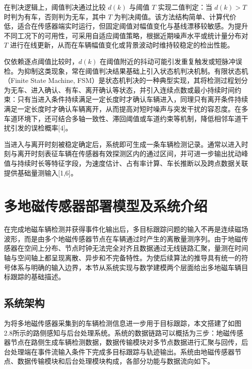 \documentclass{xdupgthesis}
\begin{document}
在判决逻辑上，阈值判决通过比较 $d(k)$ 与阈值 $T$ 实现二值判定：当 $d(k)>T$ 时判为有车，否则判为无车，其中 $T$ 为判决阈值。该方法结构简单、计算代价低，适合在传感器端实时运行，但固定阈值对幅值变化与基线漂移较敏感。为提升不同工况下的可用性，可采用自适应阈值策略，根据近期噪声水平或统计量分布对 $T$ 进行在线更新，从而在车辆幅值变化或背景波动时维持较稳定的检出性能。

仅依赖逐点阈值比较时，$d(k)$ 在阈值附近的抖动可能引发重复触发或短脉冲误检。为抑制这类现象，常在阈值判决结果基础上引入状态机判决机制。有限状态机（Finite State Machine, FSM）是状态机判决的一种典型实现，其将检测过程划分为无车、进入确认、有车、离开确认等状态，并引入连续点数或最小持续时间约束：只有当进入条件持续满足一定长度时才确认车辆进入，同理只有离开条件持续满足一定长度时才确认车辆离开，从而提高对短时噪声与突发干扰的容忍度。在多车道环境下，还可结合多轴一致性、滞回阈值或车道约束等机制，降低相邻车道干扰引发的误检概率[4]。

当进入与离开时刻被稳定确定后，系统即可生成一条车辆检测记录。通常以进入时刻与离开时刻表征车辆在传感器有效探测区内的通过区间，并可进一步输出扰动峰值与持续时长等特征字段，为速度估计、占有率计算、车长推断以及跨点数据关联提供基础量测输入[1,6]。


\section{多地磁传感器部署模型及系统介绍}\label{sec:ch2_platform}

在完成地磁车辆检测并获得事件化输出后，多目标跟踪问题的输入不再是连续磁场波形，而是由多个地磁传感器节点在车辆通过时产生的离散量测序列。由于地磁传感器在空间上分布、节点时钟无法完全对齐且数据通过无线链路汇聚，量测在时间轴与空间轴上都呈现离散、异步和不完备特性。为使后续算法的推导具有统一的符号体系与明确的输入边界，本节从系统实现与数学建模两个层面给出多地磁车辆目标跟踪的基础描述。



\subsection{系统架构}
为将多地磁传感器采集到的车辆检测信息进一步用于目标跟踪，本文搭建了如图2.8所示的路侧感知与后台处理系统。系统的数据链路可以概括为三步：地磁传感器节点在路侧生成车辆检测数据，数据传输模块对多节点数据进行汇聚与回传，后台处理端在事件流输入条件下完成多目标跟踪与轨迹输出。系统由地磁传感器节点、数据传输模块和后台处理模块构成，各部分功能与数据流向如下。

\end{document}

